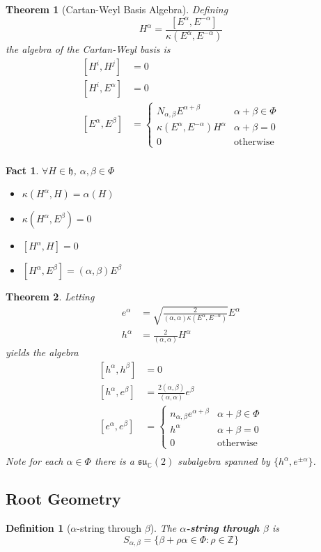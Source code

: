 \documentclass{article}
\newtheorem{theorem}{Theorem}[subsection]
\newtheorem{definition}{Definition}[subsection]
\newtheorem{fact}{Fact}[subsection]
\newcommand{\bam}[1]{\textbf{#1}}
\newcommand{\mf}[1]{\mathfrak{#1}}
\newcommand{\mbb}[1]{\mathbb{#1}}
\newcommand{\comm}[2][]{\left[ #1, #2 \right]}
\begin{document}
\begin{theorem}[Cartan-Weyl Basis Algebra]
Defining 
\[
    H^\alpha = \frac{\comm[E^\alpha]{E^{-\alpha}}}{\kappa\left(E^\alpha,E^{-\alpha}\right)}
\]
the algebra of the Cartan-Weyl basis is 
\begin{align*}
    \comm[H^i]{H^j} &= 0 \\
    \comm[H^i]{E^\alpha} &= 0 \\
    \comm[E^\alpha]{E^\beta} &= \left\{ \begin{array}{lc} N_{\alpha,\beta}E^{\alpha+\beta} & \alpha+\beta\in\Phi \\
    \kappa\left(E^\alpha,E^{-\alpha}\right)H^\alpha & \alpha+\beta=0 \\
    0 & \text{otherwise}
    \end{array} \right. \\
\end{align*}
\end{theorem}

\begin{fact}
$\forall H\in\mf{h}$, $\alpha,\beta\in\Phi$
\begin{itemize}
    \item $\kappa\left(H^\alpha,H\right)=\alpha(H)$
    \item $\kappa\left(H^\alpha,E^\beta\right)=0$
    \item $\comm[H^\alpha]{H}=0$
    \item $\comm[H^\alpha]{E^\beta}=(\alpha,\beta)E^\beta$
\end{itemize}
\end{fact}

\begin{theorem}
Letting 
\begin{align*}
    e^\alpha &= \sqrt{\frac{2}{(\alpha,\alpha)\kappa\left(E^\alpha,E^{-\alpha}\right)}}E^\alpha \\
    h^\alpha &= \frac{2}{(\alpha,\alpha)}H^\alpha
\end{align*}
yields the algebra
\begin{align*}
    \comm[h^\alpha]{h^\beta} &= 0 \\
    \comm[h^\alpha]{e^\beta} &= \frac{2(\alpha,\beta)}{(\alpha,\alpha)}e^\beta \\
    \comm[e^\alpha]{e^\beta} &= \left\{ \begin{array}{lc} n_{\alpha,\beta}e^{\alpha+\beta} & \alpha+\beta\in\Phi \\
    h^\alpha & \alpha+\beta=0 \\
    0 & \text{otherwise}
    \end{array} \right.\\
\end{align*}
Note for each $\alpha\in\Phi$ there is a $\mf{su}_\mbb{C}(2)$ subalgebra spanned by $\lbrace h^\alpha, e^{\pm\alpha}\rbrace$. 
\end{theorem}


\subsection{Root Geometry}

\begin{definition}[$\alpha$-string through $\beta$]
The \bam{$\alpha$-string through $\beta$} is 
\[
S_{\alpha, \beta}=\lbrace \beta+\rho\alpha\in\Phi : \rho\in\mbb{Z} \rbrace
\]
\end{definition}
\end{document}
